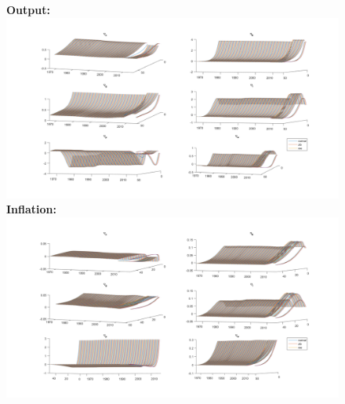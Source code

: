 \documentclass[12pt,reqno]{article}
\numberwithin{equation}{section}
\begin{document}
\begin{figure}[H]
\textbf{Output:}\\
\includegraphics[scale=0.5]{MSV_impresp_output_3d.pdf}
\textbf{Inflation:}\\
\includegraphics[scale=0.5]{MSV_impresp_pinf_3d.pdf}

\end{figure}
\end{document}
